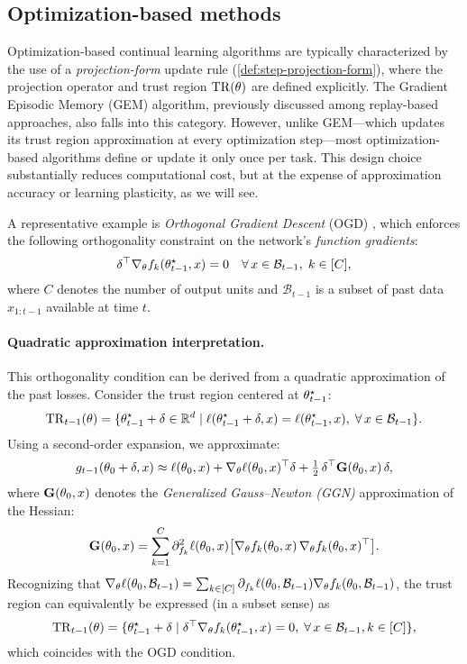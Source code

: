 \documentclass[10pt]{article} %
\newcommand{\memory}{\mathcal{B}}
\begin{document}
\subsection{Optimization-based methods}
\label{sec:optimization-based}

Optimization-based continual learning algorithms are typically characterized by the use of a \emph{projection-form} update rule (\cref{def:step-projection-form}), where the projection operator and trust region $\mathrm{TR}(\theta)$ are defined explicitly.  
The Gradient Episodic Memory (GEM) algorithm, previously discussed among replay-based approaches, also falls into this category.  
However, unlike GEM—which updates its trust region approximation at every optimization step—most optimization-based algorithms define or update it only once per task.  
This design choice substantially reduces computational cost, but at the expense of approximation accuracy or learning plasticity, as we will see.

A representative example is \emph{Orthogonal Gradient Descent} (OGD) \citep{farajtabarOrthogonalGradientDescent2020}, which enforces the following orthogonality constraint on the network’s \emph{function gradients}:
\[
\delta^\top \nabla_\param f_k(\param_{t-1}^\star, x) = 0 
\quad \forall \, x \in \memory_{t-1}, \; k \in [C],
\]
where $C$ denotes the number of output units and $\memory_{t-1}$ is a subset of past data $x_{1:t-1}$ available at time $t$.

\paragraph{Quadratic approximation interpretation.}
This orthogonality condition can be derived from a quadratic approximation of the past losses.  
Consider the trust region centered at $\theta_{t-1}^\star$:
\[
\mathrm{TR}_{t-1}(\param) 
= \{\param_{t-1}^\star + \delta \in \mathbb{R}^d 
  \mid \loss(\param_{t-1}^\star + \delta, x) = \loss(\param_{t-1}^\star, x), \;
  \forall\,x \in \memory_{t-1}\}.
\]
Using a second-order expansion, we approximate:
\[
g_{t-1}(\theta_0 + \delta, x)
\approx
\ell(\theta_0, x)
+ \nabla_\theta \ell(\theta_0, x)^\top \delta
+ \tfrac{1}{2}\, \delta^\top \mathbf{G}(\theta_0, x)\, \delta,
\]
where $\mathbf{G}(\theta_0, x)$ denotes the \emph{Generalized Gauss–Newton (GGN)} approximation of the Hessian:
\[
\mathbf{G}(\theta_0, x) 
= \sum_{k=1}^C \partial_{f_k}^2 \ell(\theta_0, x)
  \big[ \nabla_\theta f_k(\theta_0, x)\, \nabla_\theta f_k(\theta_0, x)^\top \big].
\]
Recognizing that 
$\nabla_\param \loss(\param_0, \memory_{t-1})
= \sum_{k \in [C]} \partial_{f_k} \loss(\param_0, \memory_{t-1}) \nabla_\param f_k(\param_0, \memory_{t-1})$,
the trust region can equivalently be expressed (in a subset sense) as
\[
\mathrm{TR}_{t-1}(\param)
= \{\param_{t-1}^\star + \delta 
\mid 
\delta^\top \nabla_\param f_k(\param_{t-1}^\star, x) = 0, 
\;\forall\,x \in \memory_{t-1}, k \in [C]\},
\]
which coincides with the OGD condition.
\end{document}
